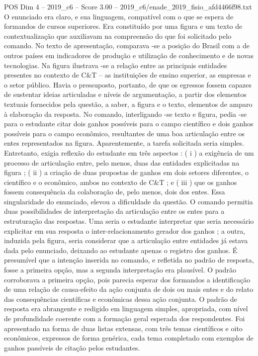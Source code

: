 \begin{textsample}{POS Dim 4 – 2019\_c6 – Score 3.00 – 2019\_c6/enade\_2019\_fisio\_afd4466f98.txt}
O enunciado era claro, e sua linguagem, compatível com o que se espera de formandos de cursos superiores.
Era constituído por uma figura e um texto de contextualização que auxiliavam na compreensão do que foi solicitado pelo comando.
No texto de apresentação, comparava -se a posição do Brasil com a de outros países em indicadores de produção e utilização de conhecimento e de novas tecnologias.
Na figura ilustrava -se a relação entre as principais entidades presentes no contexto de C\&T – as instituições de ensino superior, as empresas e o setor público.
Havia o pressuposto, portanto, de que os egressos fossem capazes de sustentar ideias articuladas e níveis de argumentação, a partir dos elementos textuais fornecidos pela questão, a saber, a figura e o texto, elementos de amparo à elaboração da resposta.
No comando, interligando -se texto e figura, pedia -se para o estudante citar dois ganhos possíveis para o campo científico e dois ganhos possíveis para o campo econômico, resultantes de uma boa articulação entre os entes representados na figura.
Aparentemente, a tarefa solicitada seria simples.
Entretanto, exigia reflexão do estudante em três aspectos : ( i ) a exigência de um processo de articulação entre, pelo menos, duas das entidades explicitadas na figura ; ( ii ) a criação de duas propostas de ganhos em dois setores diferentes, o científico e o econômico, ambos no contexto de C\&T ; e ( iii ) que os ganhos fossem consequência da colaboração de, pelo menos, dois dos entes.
Essa singularidade do enunciado, elevou a dificuldade da questão.
O comando permitia duas possibilidades de interpretação da articulação entre os entes para a estruturação das respostas.
Uma seria o estudante interpretar que seria necessário explicitar em sua resposta o inter-relacionamento gerador dos ganhos ; a outra, induzida pela figura, seria considerar que a articulação entre entidades já estava dada pelo enunciado, deixando ao estudante apenas o registro dos ganhos.
É presumível que a intenção inserida no comando, e refletida no padrão de resposta, fosse a primeira opção, mas a segunda interpretação era plausível.
O padrão corroborava a primeira opção, pois parecia esperar dos formandos a identificação de uma relação de causa-efeito da ação conjunta de dois ou mais entes e do relato das consequências científicas e econômicas dessa ação conjunta.
O padrão de resposta era abrangente e redigido em linguagem simples, apropriada, com nível de profundidade coerente com a formação geral esperada dos respondentes.
Foi apresentado na forma de duas listas extensas, com três temas científicos e oito econômicos, expressos de forma genérica, cada tema completado com exemplos de ganhos passíveis de citação pelos estudantes.

\end{textsample}
